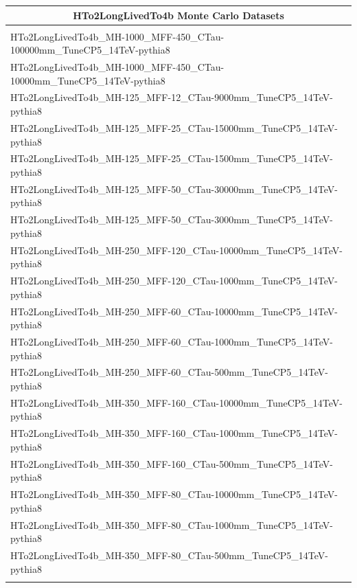 \begin{center}
\begin{tabular}{ l }
\multicolumn{1}{c}{\Large HTo2LongLivedTo4b Monte Carlo Datasets}\\
\hline
\\
HTo2LongLivedTo4b\_MH-1000\_MFF-450\_CTau-100000mm\_TuneCP5\_14TeV-pythia8 \\
HTo2LongLivedTo4b\_MH-1000\_MFF-450\_CTau-10000mm\_TuneCP5\_14TeV-pythia8 \\
HTo2LongLivedTo4b\_MH-125\_MFF-12\_CTau-9000mm\_TuneCP5\_14TeV-pythia8 \\
HTo2LongLivedTo4b\_MH-125\_MFF-25\_CTau-15000mm\_TuneCP5\_14TeV-pythia8 \\
HTo2LongLivedTo4b\_MH-125\_MFF-25\_CTau-1500mm\_TuneCP5\_14TeV-pythia8 \\
HTo2LongLivedTo4b\_MH-125\_MFF-50\_CTau-30000mm\_TuneCP5\_14TeV-pythia8 \\
HTo2LongLivedTo4b\_MH-125\_MFF-50\_CTau-3000mm\_TuneCP5\_14TeV-pythia8 \\
HTo2LongLivedTo4b\_MH-250\_MFF-120\_CTau-10000mm\_TuneCP5\_14TeV-pythia8 \\
HTo2LongLivedTo4b\_MH-250\_MFF-120\_CTau-1000mm\_TuneCP5\_14TeV-pythia8 \\
HTo2LongLivedTo4b\_MH-250\_MFF-60\_CTau-10000mm\_TuneCP5\_14TeV-pythia8 \\
HTo2LongLivedTo4b\_MH-250\_MFF-60\_CTau-1000mm\_TuneCP5\_14TeV-pythia8 \\
HTo2LongLivedTo4b\_MH-250\_MFF-60\_CTau-500mm\_TuneCP5\_14TeV-pythia8 \\
HTo2LongLivedTo4b\_MH-350\_MFF-160\_CTau-10000mm\_TuneCP5\_14TeV-pythia8 \\
HTo2LongLivedTo4b\_MH-350\_MFF-160\_CTau-1000mm\_TuneCP5\_14TeV-pythia8 \\
HTo2LongLivedTo4b\_MH-350\_MFF-160\_CTau-500mm\_TuneCP5\_14TeV-pythia8 \\
HTo2LongLivedTo4b\_MH-350\_MFF-80\_CTau-10000mm\_TuneCP5\_14TeV-pythia8 \\
HTo2LongLivedTo4b\_MH-350\_MFF-80\_CTau-1000mm\_TuneCP5\_14TeV-pythia8 \\
HTo2LongLivedTo4b\_MH-350\_MFF-80\_CTau-500mm\_TuneCP5\_14TeV-pythia8 \\
\label{mc_table}
\end{tabular}
\end{center}
